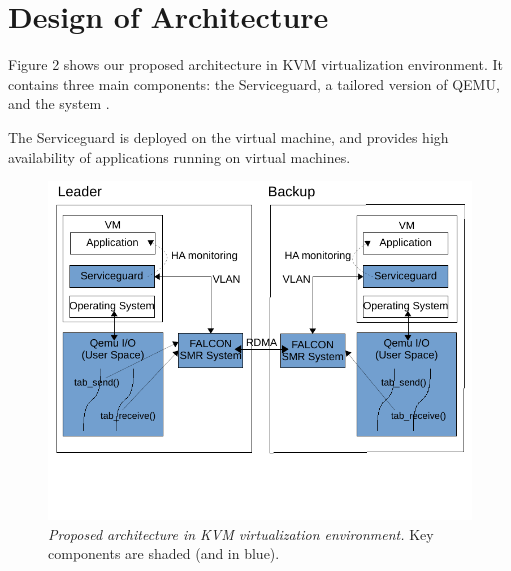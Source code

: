 \section{Design of Architecture} \label{sec:overview}

Figure 2 shows our proposed architecture in KVM virtualization environment. 
It contains three main components: the Serviceguard, a tailored version 
of QEMU, and the \smr system \smrsystem.

The Serviceguard is deployed on the virtual machine, and provides high availability 
of applications running on virtual machines.

\begin{figure}[t]
\centering
\includegraphics[width=.47\textwidth]{figures/arch}
\vspace{-.2in}
\caption{{\em Proposed architecture in KVM virtualization environment.} Key 
components are shaded (and in blue).} \label{fig:arc}
\vspace{.05in}
\end{figure}
